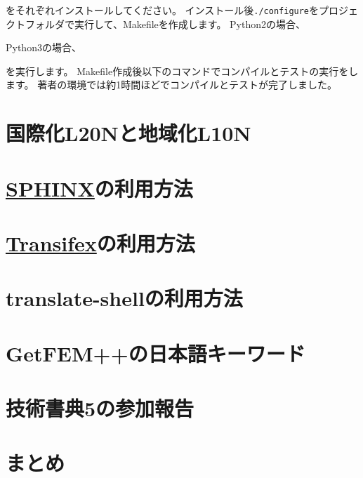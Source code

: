 \documentclass{../../style/ltjoc}
\begin{document}
をそれぞれインストールしてください。
インストール後\texttt{./configure}をプロジェクトフォルダで実行して、Makefileを作成します。
Python2の場合、
\begin{shbox}
\end{shbox}
Python3の場合、
\begin{shbox}
\end{shbox}
を実行します。
Makefile作成後以下のコマンドでコンパイルとテストの実行をします。
著者の環境では約1時間ほどでコンパイルとテストが完了しました。
\begin{shbox}
\end{shbox}

\section{国際化L20Nと地域化L10N}
\section{\href{http://www.sphinx-doc.org/en/master}{SPHINX}の利用方法}
\section{\href{https://www.transifex.com}{Transifex}の利用方法}
\section{translate-shellの利用方法}
\section{GetFEM++の日本語キーワード}
\section{技術書典5の参加報告}
\section{まとめ}
\end{document}
